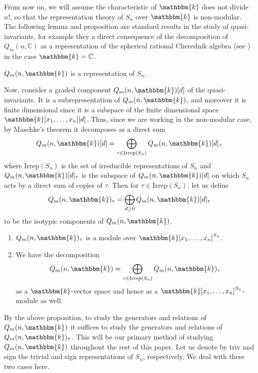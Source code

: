 \documentclass[11pt]{article}
\numberwithin{equation}{section}
\theoremstyle{definition}
\numberwithin{equation}{section}
\renewcommand{\k}{\mathbbm{k}}
\newcommand{\Irrep}{\mathrm{Irrep}}
\newcommand{\C}{\mathbb{C}}
\begin{document}
From now on, we will assume the characteristic of $\k$ does not divide $n!$, so that the representation theory of $S_n$ over $\k$ is non-modular. The following lemma and proposition are standard results in the study of quasi-invariants, for example they a direct consequence of the decomposition of $Q_m(n,\C)$ as a representation of the spherical rational Cherednik algebra (see \cite{berest2003cherednik}) in the case $\k=\C$. 

\begin{lemma}\label{lem:2.4}
    $Q_m(n,\k)$ is a representation of $S_n$.
\end{lemma}

Now, consider a graded component $Q_m(n,\k)[d]$ of the quasi-invariants. It is a subrepresentation of $Q_m(n,\k)$, and moreover it is finite dimensional since it is a subspace of the finite dimensional space $\k[x_1,\dots,x_n][d]$. Thus, since we are working in the non-modular case, by Maschke's theorem it decomposes as a direct sum
$$Q_m(n,\k)[d]=\bigoplus_{\tau\in\Irrep(S_n)}Q_m(n,\k)[d]_\tau$$
where $\Irrep(S_n)$ is the set of irreducible representations of $S_n$ and $Q_m(n,\k)[d]_\tau$ is the subspace of $Q_m(n,\k)[d]$ on which $S_n$ acts by a direct sum of copies of $\tau$. Then for $\tau\in\Irrep(S_n)$, let us define
$$Q_m(n,\k)_\tau=\bigoplus_{d\geq 0}Q_m(n,\k)[d]_\tau$$
to be the isotypic components of $Q_m(n,\k)$.

\begin{proposition}\label{prop:2.5}
\begin{enumerate}
    \item $Q_m(n,\k)_\tau$ is a module over $\k[x_1,\dots,x_n]^{S_n}$.\label{prop:2.51}
    \item We have the decomposition
    $$Q_m(n,\k)=\bigoplus_{\tau\in\Irrep(S_n)}Q_m(n,\k)_\tau$$
    as a $\k$-vector space and hence as a $\k[x_1,\dots,x_n]^{S_n}$-module as well.\label{prop:2.52}
\end{enumerate}
\end{proposition}

By the above proposition, to study the generators and relations of $Q_m(n,\k)$ it suffices to study the generators and relations of $Q_m(n,\k)_\tau$. This will be our primary method of studying $Q_m(n,\k)$ throughout the rest of this paper. Let us denote by triv and sign the trivial and sign representations of $S_n$, respectively. We deal with these two cases here.
\end{document}
